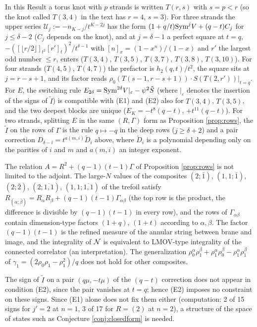 \begin{result}\label{cr:threestrand}
In this Result a torus knot with $p$ strands is written $T(r,s)$ with $s = p < r$ (so the knot called $T(3,4)$ in the text has $r = 4$, $s = 3$). For three strands the upper series $\mathcal U_j := -n_{K-j}/t^{K-2j}$ has the form $(1 + q/t)\mathrm{Sym}^jV + (q-t)C_j$ for $j \le \delta - 2$ ($C_j$ depends on the knot), and at $j = \delta - 1$ a perfect square at $t = q$, $-([\lfloor r/2\rfloor]_{t^2}[r']_t)^2/t^{\delta-1}$ with $[n]_x = (1 - x^n)/(1-x)$ and $r'$ the largest odd number $\le r$, enters ($T(3,4)$, $T(3,5)$, $T(3,7)$, $T(3,8)$, $T(3,10)$). For four strands ($T(4,5)$, $T(4,7)$) the prefactor is $h_2(q,t)/t^2$, the square sits at $j = r - s + 1$, and its factor reads $\rho_0(T(s-1, r-s+1))\cdot S(T(2,r'))|_{t=q}$. For $E$, the switching rule $E_{2\delta} = \mathrm{Sym}^{2\delta}V|_{\varepsilon} - \psi^2\tilde S$ (where $|_\varepsilon$ denotes the insertion of the signs of $\tilde I$) is compatible with (E1) and (E2) also for $T(3,4)$, $T(3,5)$, and the two deepest blocks are unique ($E_K = -t^8(q-t)$, $+t^{11}(q-t)$). For two strands, splitting $E$ in the same $(R, \Gamma)$ form as Proposition \ref{prop:rows}, the $\tilde I$ on the rows of $\Gamma$ is the rule $q \mapsto -q$ in the deep rows ($j \ge \delta + 2$) and a pair correction $D_{\delta-i} = t^{a(m,i)}\tilde D_i$ above, where $\tilde D_i$ is a polynomial depending only on the parities of $i$ and $m$ and $a(m,i)$ an integer exponent.
\end{result}
\begin{result}\label{cr:composite}
The relation $A = R^2 + (q-1)(t-1)\Gamma$ of Proposition \ref{prop:rows} is not limited to the adjoint. The large-$N$ values of the composites $(2;\bar1)$, $(1,1;\bar1)$, $(2;\bar2)$, $(2;\overline{1,1})$, $(1,1;\overline{1,1})$ of the trefoil satisfy $R_{(\alpha;\bar\beta)} = R_\alpha R_\beta + (q-1)(t-1)\Gamma_{\alpha\beta}$ (the top row is the product, the difference is divisible by $(q-1)(t-1)$ in every row), and the rows of $\Gamma_{\alpha\beta}$ contain dimension-type factors $(1+q)$, $(1+t)$ according to $\alpha, \beta$. The factor $(q-1)(t-1)$ is the refined measure of the annular string between brane and image, and the integrality of $\mathcal{N}$ is equivalent to LMOV-type integrality of the connected correlator (an interpretation). The generalization $\rho_0^\alpha\rho_1^\beta + \rho_1^\alpha\rho_0^\beta - \rho_1^\alpha\rho_1^\beta$ of $\gamma_1 = (2\rho_0\rho_1 - \rho_1^2)/q$ does not hold for other composites.
\end{result}
\begin{remark}\label{rem:pairblind}
The sign of $\tilde I$ on a pair $(q\mu, -t\mu)$ of the $(q-t)$ correction does not appear in condition (E2), since the pair vanishes at $t = q$; hence (E2) imposes no constraint on these signs. Since (E1) alone does not fix them either (computation: 2 of 15 signs for $j' = 2$ at $n = 1$, 3 of 17 for $R = (2)$ at $n = 2$), a structure of the space of states such as Conjecture \ref{conj:closedform} is needed.
\end{remark}

